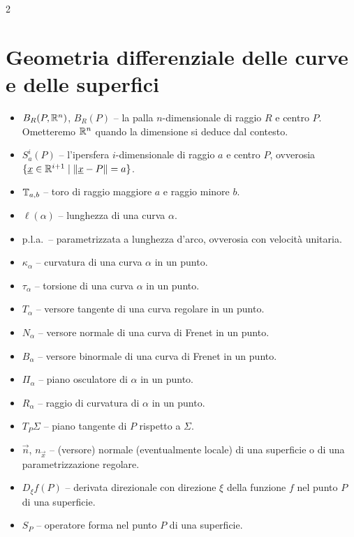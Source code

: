 \begin{multicols*}{2}
      \section*{Geometria differenziale delle curve e delle superfici}

      \begin{itemize}
            \item $B_R(P, \mathbb{R}^n)$, $B_R(P)$ -- la palla $n$-dimensionale di raggio $R$ e centro $P$. Ometteremo $\mathbb{R}^n$ quando la dimensione si deduce dal contesto.
            \item $S_a^i(P)$ -- l'ipersfera $i$-dimensionale di raggio $a$ e centro $P$, ovverosia $\{{\underline{x}} \in \mathbb{R}^{i+1} \mid \left\lVert {\underline{x}} - P \right\rVert = a\}$.
            \item $\mathbb{T}_{a, b}$ -- toro di raggio maggiore $a$ e raggio minore $b$.
            \item $\ell(\alpha)$ -- lunghezza di una curva $\alpha$.
            \item p.l.a.~-- parametrizzata a lunghezza d'arco, ovverosia con velocità unitaria.
            \item $\kappa_\alpha$ -- curvatura di una curva $\alpha$ in un punto.
            \item $\tau_\alpha$ -- torsione di una curva $\alpha$ in un punto.
            \item $T_\alpha$ -- versore tangente di una curva regolare in un punto.
            \item $N_\alpha$ -- versore normale di una curva di Frenet in un punto.
            \item $B_\alpha$ -- versore binormale di una curva di Frenet in un punto.
            \item $\Pi_\alpha$ -- piano osculatore di $\alpha$ in un punto.
            \item $R_\alpha$ -- raggio di curvatura di $\alpha$ in un punto.
            \item $T_P \Sigma$ -- piano tangente di $P$ rispetto a $\Sigma$.
            \item $\vec{n}$, $n_{\vec{x}}$ -- (versore) normale (eventualmente locale) di una superficie o di una parametrizzazione regolare.
            \item $D_\xi f(P)$ -- derivata direzionale con direzione $\xi$ della funzione $f$ nel punto $P$ di una superficie.
            \item $S_P$ -- operatore forma nel punto $P$ di una superficie.

\end{itemize}
\end{multicols*}
